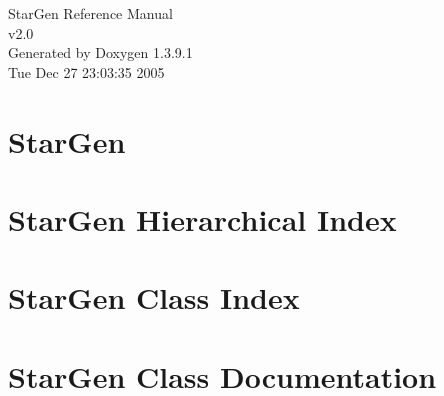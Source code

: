 \documentclass[a4paper]{book}
\begin{document}
\begin{titlepage}
\vspace*{7cm}
\begin{center}
{\Large Star\-Gen Reference Manual\\[1ex]\large v2.0 }\\
\vspace*{1cm}
{\large Generated by Doxygen 1.3.9.1}\\
\vspace*{0.5cm}
{\small Tue Dec 27 23:03:35 2005}\\
\end{center}
\end{titlepage}
\clearemptydoublepage
{}
\tableofcontents
\clearemptydoublepage
{}
\chapter{Star\-Gen }
\label{index}
\chapter{Star\-Gen Hierarchical Index}

\chapter{Star\-Gen Class Index}

\chapter{Star\-Gen Class Documentation}










\printindex
\end{document}
